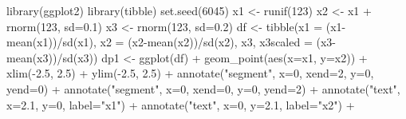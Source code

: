 \documentclass[
  letterpaper,
]{book}
\newenvironment{Shaded}{\begin{snugshade}}{\end{snugshade}}
\newcommand{\AttributeTok}[1]{\textcolor[rgb]{0.40,0.45,0.13}{#1}}
\newcommand{\DecValTok}[1]{\textcolor[rgb]{0.68,0.00,0.00}{#1}}
\newcommand{\FloatTok}[1]{\textcolor[rgb]{0.68,0.00,0.00}{#1}}
\newcommand{\FunctionTok}[1]{\textcolor[rgb]{0.28,0.35,0.67}{#1}}
\newcommand{\NormalTok}[1]{\textcolor[rgb]{0.00,0.23,0.31}{#1}}
\newcommand{\OtherTok}[1]{\textcolor[rgb]{0.00,0.23,0.31}{#1}}
\newcommand{\SpecialCharTok}[1]{\textcolor[rgb]{0.37,0.37,0.37}{#1}}
\newcommand{\StringTok}[1]{\textcolor[rgb]{0.13,0.47,0.30}{#1}}
\begin{document}
\begin{Shaded}
\begin{Highlighting}[]
\FunctionTok{library}\NormalTok{(ggplot2)}
\FunctionTok{library}\NormalTok{(tibble)}
\FunctionTok{set.seed}\NormalTok{(}\DecValTok{6045}\NormalTok{)}
\NormalTok{x1 }\OtherTok{\textless{}{-}} \FunctionTok{runif}\NormalTok{(}\DecValTok{123}\NormalTok{)}
\NormalTok{x2 }\OtherTok{\textless{}{-}}\NormalTok{ x1 }\SpecialCharTok{+} \FunctionTok{rnorm}\NormalTok{(}\DecValTok{123}\NormalTok{, }\AttributeTok{sd=}\FloatTok{0.1}\NormalTok{)}
\NormalTok{x3 }\OtherTok{\textless{}{-}} \FunctionTok{rnorm}\NormalTok{(}\DecValTok{123}\NormalTok{, }\AttributeTok{sd=}\FloatTok{0.2}\NormalTok{)}
\NormalTok{df }\OtherTok{\textless{}{-}} \FunctionTok{tibble}\NormalTok{(}\AttributeTok{x1 =}\NormalTok{ (x1}\SpecialCharTok{{-}}\FunctionTok{mean}\NormalTok{(x1))}\SpecialCharTok{/}\FunctionTok{sd}\NormalTok{(x1), }
             \AttributeTok{x2 =}\NormalTok{ (x2}\SpecialCharTok{{-}}\FunctionTok{mean}\NormalTok{(x2))}\SpecialCharTok{/}\FunctionTok{sd}\NormalTok{(x2),}
\NormalTok{             x3, }
             \AttributeTok{x3scaled =}\NormalTok{ (x3}\SpecialCharTok{{-}}\FunctionTok{mean}\NormalTok{(x3))}\SpecialCharTok{/}\FunctionTok{sd}\NormalTok{(x3))}
\NormalTok{dp1 }\OtherTok{\textless{}{-}} \FunctionTok{ggplot}\NormalTok{(df) }\SpecialCharTok{+} 
  \FunctionTok{geom\_point}\NormalTok{(}\FunctionTok{aes}\NormalTok{(}\AttributeTok{x=}\NormalTok{x1, }\AttributeTok{y=}\NormalTok{x2)) }\SpecialCharTok{+}
  \FunctionTok{xlim}\NormalTok{(}\SpecialCharTok{{-}}\FloatTok{2.5}\NormalTok{, }\FloatTok{2.5}\NormalTok{) }\SpecialCharTok{+} \FunctionTok{ylim}\NormalTok{(}\SpecialCharTok{{-}}\FloatTok{2.5}\NormalTok{, }\FloatTok{2.5}\NormalTok{) }\SpecialCharTok{+}
  \FunctionTok{annotate}\NormalTok{(}\StringTok{"segment"}\NormalTok{, }\AttributeTok{x=}\DecValTok{0}\NormalTok{, }\AttributeTok{xend=}\DecValTok{2}\NormalTok{, }\AttributeTok{y=}\DecValTok{0}\NormalTok{, }\AttributeTok{yend=}\DecValTok{0}\NormalTok{) }\SpecialCharTok{+}
  \FunctionTok{annotate}\NormalTok{(}\StringTok{"segment"}\NormalTok{, }\AttributeTok{x=}\DecValTok{0}\NormalTok{, }\AttributeTok{xend=}\DecValTok{0}\NormalTok{, }\AttributeTok{y=}\DecValTok{0}\NormalTok{, }\AttributeTok{yend=}\DecValTok{2}\NormalTok{) }\SpecialCharTok{+}
  \FunctionTok{annotate}\NormalTok{(}\StringTok{"text"}\NormalTok{, }\AttributeTok{x=}\FloatTok{2.1}\NormalTok{, }\AttributeTok{y=}\DecValTok{0}\NormalTok{, }\AttributeTok{label=}\StringTok{"x1"}\NormalTok{) }\SpecialCharTok{+}
  \FunctionTok{annotate}\NormalTok{(}\StringTok{"text"}\NormalTok{, }\AttributeTok{x=}\DecValTok{0}\NormalTok{, }\AttributeTok{y=}\FloatTok{2.1}\NormalTok{, }\AttributeTok{label=}\StringTok{"x2"}\NormalTok{) }\SpecialCharTok{+}

\end{Highlighting}
\end{Shaded}
\end{document}
